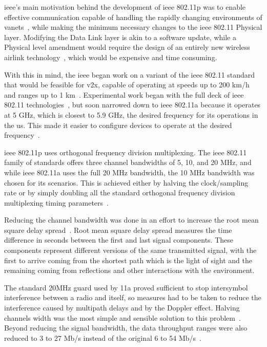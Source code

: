 \gls{ieee}'s main motivation behind the development of \gls{ieee} 802.11p was to enable effective communication capable of handling the rapidly changing environments of \glspl{vanet}~\cite{jiang_ieee_2008}, while making the minimum necessary changes to the \gls{ieee} 802.11 Physical layer. Modifying the Data Link layer is akin to a software update, while a Physical level amendment would require the design of an entirely new wireless airlink technology~\cite{jiang_ieee_2008}, which would be expensive and time consuming. 

With this in mind, the \gls{ieee} began work on a variant of the \gls{ieee} 802.11 standard that would be feasible for \gls{v2x}, capable of operating at speeds up to 200 km/h and ranges up to 1 km~\cite{jakubiak_state_2008}. Experimental work began with the full deck of \gls{ieee} 802.11 technologies~\cite{toor_vehicle_2008}, but soon narrowed down to \gls{ieee} 802.11a because it operates at 5 GHz, which is closest to 5.9 GHz, the desired frequency for \gls{its} operations in the \gls{us}. This made it easier to configure devices to operate at the desired frequency~\cite{jiang_ieee_2008}.


\gls{ieee} 802.11p uses orthogonal frequency division multiplexing. The \gls{ieee} 802.11 family of standards offers three channel bandwidths of 5, 10, and 20 MHz, and while \gls{ieee} 802.11a uses the full 20 MHz bandwidth, the 10 MHz bandwidth was chosen for \gls{its} scenarios. This is achieved either by halving the clock/sampling rate or by simply doubling all the standard orthogonal frequency division multiplexing timing parameters~\cite{rohde__schwarz_intelligent_2019}.

Reducing the channel bandwidth was done in an effort to increase the root mean square delay spread~\cite{toor_vehicle_2008}. Root mean square delay spread measures the time difference in seconds between the first and last signal components. These components represent different versions of the same transmitted signal, with the first to arrive coming from the shortest path which is the light of sight and the remaining coming from reflections and other interactions with the environment.

The standard 20MHz guard used by 11a proved sufficient to stop intersymbol interference between a radio and itself, so measures had to be taken to reduce the interference caused by multipath delays and by the Doppler effect. Halving channels width was the most simple and sensible solution to this problem~\cite{jiang_ieee_2008}. Beyond reducing the signal bandwidth, the data throughput ranges were also reduced to 3 to 27 Mb/s instead of the original 6 to 54 Mb/s~\cite{toor_vehicle_2008}.

